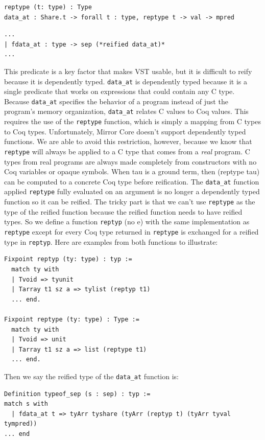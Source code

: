 \documentclass{puthesis}
\begin{document}
\begin{lstlisting}
reptype (t: type) : Type
data_at : Share.t -> forall t : type, reptype t -> val -> mpred
\end{lstlisting}
\begin{lstlisting}
...
| fdata_at : type -> sep (*reified data_at)*
...
\end{lstlisting}

This predicate is a key factor that makes VST usable, but it is
difficult to reify because it is dependently typed.
\lstinline|data_at| is dependently typed because it is a single
predicate that works on expressions that could contain any C
type. Because \lstinline|data_at| specifies the behavior of a program
instead of just the program's memory organization, \lstinline|data_at|
relates C values to Coq values. This requires the use of the
\lstinline|reptype| function, which is simply a mapping from C types
to Coq types. Unfortunately, Mirror Core doesn't support dependently
typed functions. We are able to avoid this restriction, however,
because we know that \lstinline|reptype| will always be applied to a C
type that comes from a \emph{real} program. C types from real programs
are always made completely from constructors with no Coq variables or
opaque symbols.  When tau is a ground term, then (reptype tau) can be
computed to a concrete Coq type before reification. The
\lstinline|data_at| function applied \lstinline|reptype| fully
evaluated on an argument is no longer a dependently typed function so
it can be reified. The tricky part is that we can't use
\lstinline|reptype| as the type of the reified function because the
reified function needs to have reified types. So we define a function
\lstinline|reptyp| (no e) with the same implementation as
\lstinline|reptype| except for every Coq type returned in
\lstinline|reptype| is exchanged for a reified type in
\lstinline|reptyp|. Here are examples from both functions to
illustrate:

\begin{lstlisting}
Fixpoint reptyp (ty: type) : typ :=
  match ty with
  | Tvoid => tyunit
  | Tarray t1 sz a => tylist (reptyp t1)
  ... end.

Fixpoint reptype (ty: type) : Type :=
  match ty with
  | Tvoid => unit
  | Tarray t1 sz a => list (reptype t1)
  ... end.
\end{lstlisting}

Then we say the reified type of the \lstinline|data_at| function is:

\begin{lstlisting}
Definition typeof_sep (s : sep) : typ :=
match s with
  | fdata_at t => tyArr tyshare (tyArr (reptyp t) (tyArr tyval tympred))
... end
\end{lstlisting}
\end{document}
